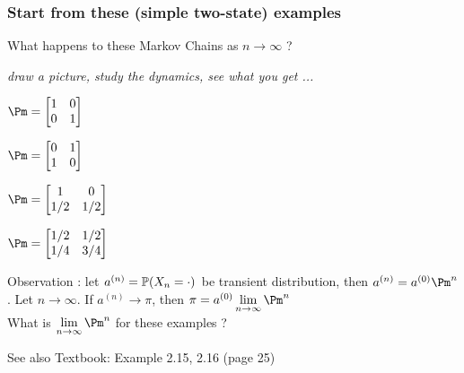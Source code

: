 \documentclass[english,10pt]{beamer}
\begin{document}
 

 




\begin{frame}
\frametitle{Start from these (simple two-state) examples}

{What happens to  these Markov Chains as $n\to \infty$ ?}

{\small \it draw a picture, study the dynamics,  see what you get ... }

\ben
\item   $\Pm=\begin{bmatrix}
1&0\\ 0&1
\end{bmatrix} $
\item $\Pm=\begin{bmatrix}
0&1\\ 1&0
\end{bmatrix} $
\item $\Pm=\begin{bmatrix}
1&0\\ 1/2&1/2
\end{bmatrix} $
\item $\Pm=\begin{bmatrix}
1/2&1/2\\ 1/4& 3/4
\end{bmatrix} $
\een
%
\pause


Observation :  let $a^{(n)}=\mathbb{P}(X_n=\cdot)$ be transient distribution, then
$a^{(n)} = a^{(0)} \Pm^n$. Let $n\to \infty$. If 
$a^{(n)} \to \pi$,  then
$\pi = a^{(0)}\displaystyle \lim_{n\to\infty} \Pm^n $ 
\\

What is  $\displaystyle \lim_{n\to\infty}\Pm^n$   for these examples ?

\pause
See also 
Textbook: Example 2.15, 2.16  (page 25) 



\end{frame}
\end{document}

